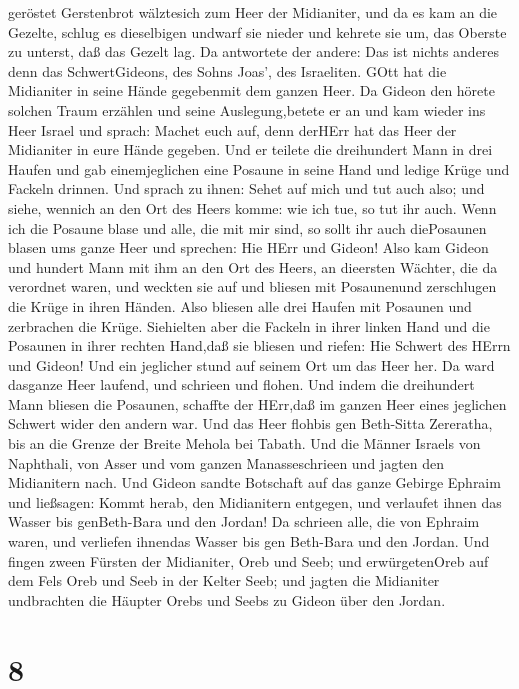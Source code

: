 geröstet Gerstenbrot wälztesich zum Heer der Midianiter, und da es kam
an die Gezelte, schlug es dieselbigen undwarf sie nieder und kehrete sie
um, das Oberste zu unterst, daß das Gezelt lag.  Da
antwortete der andere: Das ist nichts anderes denn das SchwertGideons,
des Sohns Joas', des Israeliten. GOtt hat die Midianiter in seine Hände
gegebenmit dem ganzen Heer.  Da Gideon den hörete solchen
Traum erzählen und seine Auslegung,betete er an und kam wieder ins Heer
Israel und sprach: Machet euch auf, denn derHErr hat das Heer der
Midianiter in eure Hände gegeben.  Und er teilete die
dreihundert Mann in drei Haufen und gab einemjeglichen eine Posaune in
seine Hand und ledige Krüge und Fackeln drinnen.  Und
sprach zu ihnen: Sehet auf mich und tut auch also; und siehe, wennich an
den Ort des Heers komme: wie ich tue, so tut ihr auch. 
Wenn ich die Posaune blase und alle, die mit mir sind, so sollt ihr auch
diePosaunen blasen ums ganze Heer und sprechen: Hie HErr und Gideon!
 Also kam Gideon und hundert Mann mit ihm an den Ort des
Heers, an dieersten Wächter, die da verordnet waren, und weckten sie auf
und bliesen mit Posaunenund zerschlugen die Krüge in ihren Händen.
 Also bliesen alle drei Haufen mit Posaunen und zerbrachen
die Krüge. Siehielten aber die Fackeln in ihrer linken Hand und die
Posaunen in ihrer rechten Hand,daß sie bliesen und riefen: Hie Schwert
des HErrn und Gideon!  Und ein jeglicher stund auf seinem
Ort um das Heer her. Da ward dasganze Heer laufend, und schrieen und
flohen.  Und indem die dreihundert Mann bliesen die
Posaunen, schaffte der HErr,daß im ganzen Heer eines jeglichen Schwert
wider den andern war. Und das Heer flohbis gen Beth-Sitta Zereratha, bis
an die Grenze der Breite Mehola bei Tabath.  Und die Männer
Israels von Naphthali, von Asser und vom ganzen Manasseschrieen und
jagten den Midianitern nach.  Und Gideon sandte Botschaft
auf das ganze Gebirge Ephraim und ließsagen: Kommt herab, den
Midianitern entgegen, und verlaufet ihnen das Wasser bis genBeth-Bara
und den Jordan! Da schrieen alle, die von Ephraim waren, und verliefen
ihnendas Wasser bis gen Beth-Bara und den Jordan.  Und
fingen zween Fürsten der Midianiter, Oreb und Seeb; und erwürgetenOreb
auf dem Fels Oreb und Seeb in der Kelter Seeb; und jagten die Midianiter
undbrachten die Häupter Orebs und Seebs zu Gideon über den Jordan.

\hypertarget{section-7}{%
\section{8}\label{section-7}}

